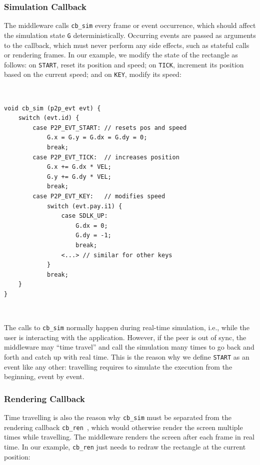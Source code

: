 \documentclass[10pt,journal,compsoc]{IEEEtran}
\newcommand{\code}[1]  {\texttt{\small{#1}}}
\begin{document}
\subsubsection{Simulation Callback}
\label{sec.tml.api.cb_sim}

The middleware calls \code{cb\_sim} every frame or event occurrence, which
should affect the simulation state \code{G} deterministically.
Occurring events are passed as arguments to the callback, which must never
perform any side effects, such as stateful calls or rendering frames.
In our example, we modify the state of the rectangle as follows:
    on \code{START}, reset its position and speed;
    on \code{TICK},  increment its position based on the current speed; and
    on \code{KEY},   modify its speed:

{\footnotesize
~
\begin{verbatim}
void cb_sim (p2p_evt evt) {
    switch (evt.id) {
        case P2P_EVT_START: // resets pos and speed
            G.x = G.y = G.dx = G.dy = 0;
            break;
        case P2P_EVT_TICK:  // increases position
            G.x += G.dx * VEL;
            G.y += G.dy * VEL;
            break;
        case P2P_EVT_KEY:   // modifies speed
            switch (evt.pay.i1) {
                case SDLK_UP:
                    G.dx = 0;
                    G.dy = -1;
                    break;
                <...> // similar for other keys
            }
            break;
    }
}
\end{verbatim}
~
}

The calls to \code{cb\_sim} normally happen during real-time simulation, i.e.,
while the user is interacting with the application.
However, if the peer is out of sync, the middleware may ``time travel'' and
call the simulation many times to go back and forth and catch up with real
time.
This is the reason why we define \code{START} as an event like any other:
travelling requires to simulate the execution from the beginning, event by
event.

\subsubsection{Rendering Callback}
\label{sec.tml.api.cb_ren}

Time travelling is also the reason why \code{cb\_sim} must be separated from
the rendering callback \code{cb\_ren}~\cite{tml.js}, which would otherwise
render the screen multiple times while travelling.
The middleware renders the screen after each frame in real time.
In our example, \code{cb\_ren} just needs to redraw the rectangle at the
current position:
\end{document}
